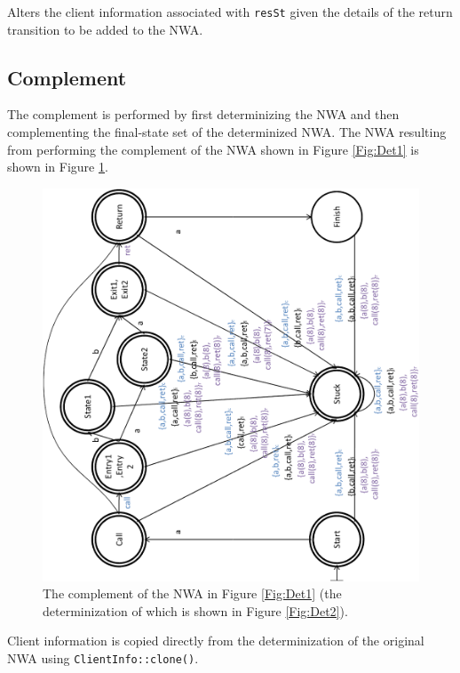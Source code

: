 \begin{description}
    Alters the client information associated with \texttt{resSt} given the
    details of the return transition to be added to the NWA. \\

\end{description}




\subsection{Complement}
\label{Se:Complement}

The complement is performed by first determinizing the NWA and then
complementing the final-state set of the determinized NWA.  The NWA resulting
from performing the complement of the NWA shown in Figure \ref{Fig:Det1} is
shown in Figure \ref{Fig:Comp1}.

\begin{figure}[p]
  \centering
    \includegraphics[width=12cm]{Figures/Figure20}
  \caption{The complement of the NWA in Figure \ref{Fig:Det1} (the
    determinization of which is shown in Figure \ref{Fig:Det2}).}
  \label{Fig:Comp1}
\end{figure}

Client information is copied directly
from the determinization of the original NWA using \texttt{ClientInfo::clone()}.


